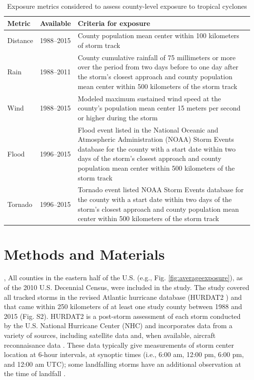 \documentclass[fleqn,10pt,lineno]{olplainarticle}
\begin{document}
\begin{table}%
\centering 
\caption{Exposure metrics considered to assess county-level exposure to 
tropical cyclones}
\begin{tabular}{p{0.9cm}p{2.5cm}p{9cm}} 
Metric & Available & Criteria for exposure \\ \midrule 
Distance & 1988--2015 & County population mean center within 100 kilometers of storm track \\ 
Rain & 1988--2011 & County cumulative rainfall of 75 millimeters or more over the period from two days before to one day after the storm's closest approach and county population mean center within 500 kilometers of the storm track \\ 
Wind & 1988--2015 & Modeled maximum sustained wind speed at the county's population mean center 15 meters per second or higher during the storm\\ 
Flood & 1996--2015 & Flood event listed in the National Oceanic and Atmospheric Administration (NOAA) Storm Events database for the county with a start date within two days of the storm's closest approach and county population mean center within 500 kilometers of the storm track \\
Tornado & 1996--2015 & Tornado event listed NOAA Storm Events database for the county with a start date within two days of the storm's closest approach and county population mean center within 500 kilometers of the storm track\\
\bottomrule 
\end{tabular} 
\label{tab:exposuremetrics} 
\end{table}

\section*{Methods and Materials}
,
All counties in the eastern half of the U.S. (e.g., Fig.
\ref{fig:averageexposure}), as of the 2010 U.S. Decennial Census, were included
in the study. The study covered all tracked storms in the revised Atlantic
hurricane database (HURDAT2 \citep{landsea2013}) and that came within 250
kilometers of at least one study county between 1988 and 2015 (Fig. S2). HURDAT2
is a post-storm assessment of each storm conducted by the U.S. National
Hurricane Center (NHC) and incorporates data from a variety of sources,
including satellite data and, when available, aircraft reconnaisance data
\citep{landsea2013, jarvinen1988}. These data typically give measurements of
storm center location at 6-hour intervals, at synoptic times (i.e., 6:00 am,
12:00 pm, 6:00 pm, and 12:00 am UTC); some landfalling storms have an additional
observation at the time of landfall \citep{landsea2013}.
\end{document}

